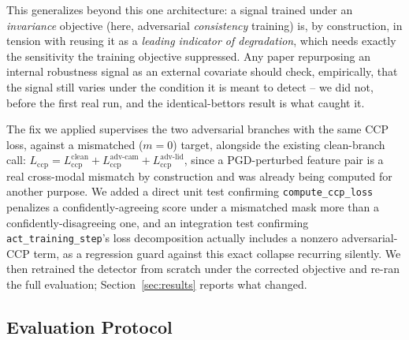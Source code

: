 This generalizes beyond this one architecture: a signal trained under an \emph{invariance} objective (here, adversarial \emph{consistency} training) is, by construction, in tension with reusing it as a \emph{leading indicator of degradation}, which needs exactly the sensitivity the training objective suppressed. Any paper repurposing an internal robustness signal as an external covariate should check, empirically, that the signal still varies under the condition it is meant to detect -- we did not, before the first real run, and the identical-bettors result is what caught it.

The fix we applied supervises the two adversarial branches with the same CCP loss, against a mismatched ($m=0$) target, alongside the existing clean-branch call: $L_{\mathrm{ccp}} = L_{\mathrm{ccp}}^{\mathrm{clean}} + L_{\mathrm{ccp}}^{\mathrm{adv\text{-}cam}} + L_{\mathrm{ccp}}^{\mathrm{adv\text{-}lid}}$, since a PGD-perturbed feature pair is a real cross-modal mismatch by construction and was already being computed for another purpose. We added a direct unit test confirming \texttt{compute\_ccp\_loss} penalizes a confidently-agreeing score under a mismatched mask more than a confidently-disagreeing one, and an integration test confirming \texttt{act\_training\_step}'s loss decomposition actually includes a nonzero adversarial-CCP term, as a regression guard against this exact collapse recurring silently. We then retrained the detector from scratch under the corrected objective and re-ran the full evaluation; Section~\ref{sec:results} reports what changed.

\subsection{Evaluation Protocol}
\label{sec:protocol}

